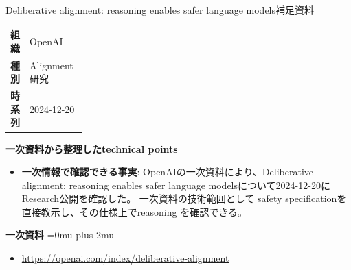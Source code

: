 \begin{technicalnote}{Deliberative alignment: reasoning enables safer language models}{補足資料}
\begingroup
\begin{tabularx}{\linewidth}{@{}>{\bfseries}p{0.22\linewidth}X@{}}
組織 & OpenAI \\
種別 & Alignment研究 \\
時系列 & 2024-12-20 \\
\end{tabularx}
\smallskip
{\bfseries 一次資料から整理したtechnical points}
\begin{itemize}[leftmargin=1.5em,itemsep=0.35em]
\item \textbf{一次情報で確認できる事実}: OpenAIの一次資料により、Deliberative alignment: reasoning enables safer language modelsについて2024-12-20にResearch公開を確認した。 一次資料の技術範囲として safety specificationを直接教示し、その仕様上でreasoning を確認できる。
\end{itemize}
\begin{minipage}{\linewidth}
\begin{samepage}
{\bfseries 一次資料}
\begingroup\sloppy
\Urlmuskip=0mu plus 2mu\relax
\begin{itemize}[leftmargin=1.5em,itemsep=0.25em]
\item {\scriptsize\url{https://openai.com/index/deliberative-alignment}}
\end{itemize}
\endgroup
\end{samepage}
\end{minipage}
\endgroup
\end{technicalnote}
\medskip
